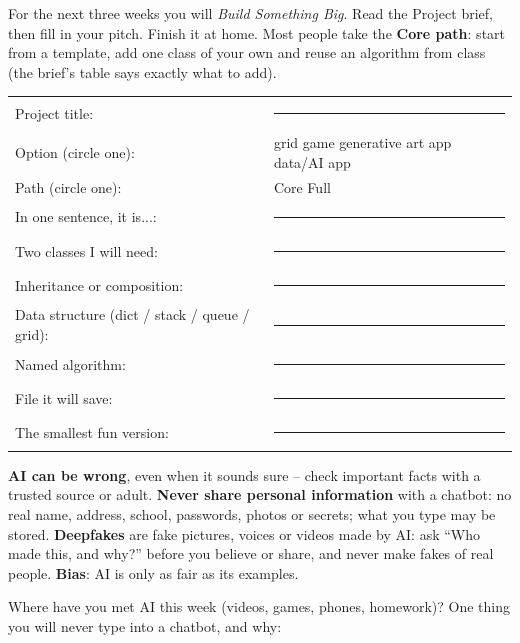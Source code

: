 \begin{exercise}
For the next three weeks you will \emph{Build Something Big}. Read the Project brief, then fill in your pitch. Finish it at home. Most people take the \textbf{Core path}: start from a template, add one class of your own and reuse an algorithm from class (the brief's table says exactly what to add).
\begin{tabular}{@{}p{4.6cm}p{\dimexpr\linewidth-4.8cm-2\tabcolsep}@{}}
Project title: & \rule{\linewidth}{0.4pt}\\[6pt]
Option (circle one): & grid game \quad generative art app \quad data/AI app\\[6pt]
Path (circle one): & Core \quad Full\\[6pt]
In one sentence, it is...: & \rule{\linewidth}{0.4pt}\\[6pt]
Two classes I will need: & \rule{\linewidth}{0.4pt}\\[6pt]
Inheritance or composition: & \rule{\linewidth}{0.4pt}\\[6pt]
Data structure (dict / stack / queue / grid): & \rule{\linewidth}{0.4pt}\\[6pt]
Named algorithm: & \rule{\linewidth}{0.4pt}\\[6pt]
File it will save: & \rule{\linewidth}{0.4pt}\\[6pt]
The smallest fun version: & \rule{\linewidth}{0.4pt}\\
\end{tabular}
\end{exercise}

\begin{safety}
\textbf{AI can be wrong}, even when it sounds sure -- check important facts with a trusted source or adult. \textbf{Never share personal information} with a chatbot: no real name, address, school, passwords, photos or secrets; what you type may be stored. \textbf{Deepfakes} are fake pictures, voices or videos made by AI: ask \enquote{Who made this, and why?} before you believe or share, and never make fakes of real people. \textbf{Bias}: AI is only as fair as its examples.
\end{safety}

\begin{vocab}
\end{vocab}

\begin{reflection}
Where have you met AI this week (videos, games, phones, homework)? 
One thing you will never type into a chatbot, and why: 
\end{reflection}
